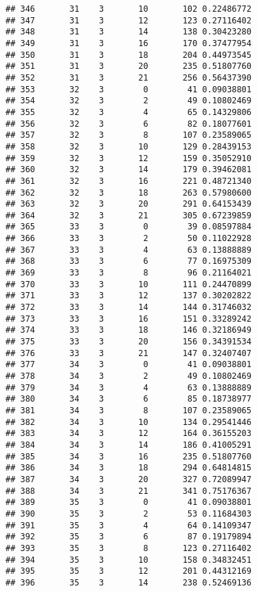 \documentclass[
]{article}
\begin{document}
\begin{verbatim}
## 346       31    3       10       102 0.22486772
## 347       31    3       12       123 0.27116402
## 348       31    3       14       138 0.30423280
## 349       31    3       16       170 0.37477954
## 350       31    3       18       204 0.44973545
## 351       31    3       20       235 0.51807760
## 352       31    3       21       256 0.56437390
## 353       32    3        0        41 0.09038801
## 354       32    3        2        49 0.10802469
## 355       32    3        4        65 0.14329806
## 356       32    3        6        82 0.18077601
## 357       32    3        8       107 0.23589065
## 358       32    3       10       129 0.28439153
## 359       32    3       12       159 0.35052910
## 360       32    3       14       179 0.39462081
## 361       32    3       16       221 0.48721340
## 362       32    3       18       263 0.57980600
## 363       32    3       20       291 0.64153439
## 364       32    3       21       305 0.67239859
## 365       33    3        0        39 0.08597884
## 366       33    3        2        50 0.11022928
## 367       33    3        4        63 0.13888889
## 368       33    3        6        77 0.16975309
## 369       33    3        8        96 0.21164021
## 370       33    3       10       111 0.24470899
## 371       33    3       12       137 0.30202822
## 372       33    3       14       144 0.31746032
## 373       33    3       16       151 0.33289242
## 374       33    3       18       146 0.32186949
## 375       33    3       20       156 0.34391534
## 376       33    3       21       147 0.32407407
## 377       34    3        0        41 0.09038801
## 378       34    3        2        49 0.10802469
## 379       34    3        4        63 0.13888889
## 380       34    3        6        85 0.18738977
## 381       34    3        8       107 0.23589065
## 382       34    3       10       134 0.29541446
## 383       34    3       12       164 0.36155203
## 384       34    3       14       186 0.41005291
## 385       34    3       16       235 0.51807760
## 386       34    3       18       294 0.64814815
## 387       34    3       20       327 0.72089947
## 388       34    3       21       341 0.75176367
## 389       35    3        0        41 0.09038801
## 390       35    3        2        53 0.11684303
## 391       35    3        4        64 0.14109347
## 392       35    3        6        87 0.19179894
## 393       35    3        8       123 0.27116402
## 394       35    3       10       158 0.34832451
## 395       35    3       12       201 0.44312169
## 396       35    3       14       238 0.52469136

\end{verbatim}
\end{document}
